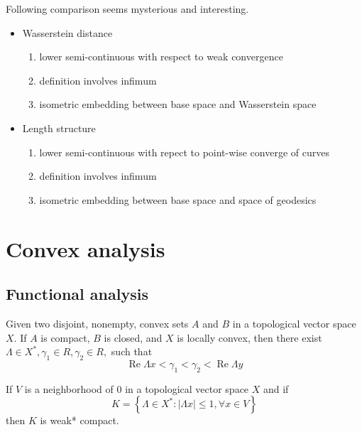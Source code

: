 \begin{rmk} 
	Following comparison seems mysterious and interesting.
	\begin{itemize}
		\item Wasserstein distance
		      \begin{enumerate}
			      \item lower semi-continuous with respect to weak convergence
			      \item definition involves infimum
			      \item isometric embedding between base space and Wasserstein space
		      \end{enumerate}
		\item Length structure
		      \begin{enumerate}
			      \item lower semi-continuous with repect to point-wise converge of curves
			      \item definition involves infimum
			      \item isometric embedding between base space and space of geodesics
		      \end{enumerate}
	\end{itemize}
\end{rmk}

\section{Convex analysis}

\subsection{Functional analysis}

\begin{thm}
	Given two disjoint, nonempty, convex sets $A$ and $B$ in a topological vector space $X$. If \( A \) is compact, \( B \) is closed, and \( X \) is locally convex, then there exist \( \Lambda \in X ^ { * } , \gamma _ { 1 } \in R , \gamma _ { 2 } \in R , \) such that
	\[
		\operatorname { Re } \Lambda x < \gamma _ { 1 } < \gamma _ { 2 } < \operatorname { Re } \Lambda y
	\]
\end{thm}

\begin{thm}
	If \( V \) is a neighborhood of 0 in a topological vector space \( X \) and if
	\[ K = \left\{ \Lambda \in X ^ { * }: | \Lambda x | \leq 1, \forall x \in V \right\} \]
	then $K$ is weak* compact.
\end{thm}

